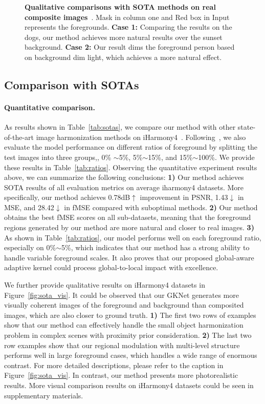 \documentclass[10pt,twocolumn,letterpaper]{article}
\begin{document}
\begin{figure*}[t]
    \caption{{\bf Qualitative comparisons with SOTA methods on real composite images}~\cite{Tsai_2017_CVPR}. Mask in column one and Red box in Input represents the foregrounds. \textbf{Case 1:} Comparing the results on the dogs, our method achieves more natural results over the sunset background.  \textbf{Case 2:} Our result dims the foreground person based on background dim light, which achieves a more natural effect. }
    \label{fig:real_vis}
    \vspace{-1.0em}
\end{figure*}

\subsection{Comparison with SOTAs}

\paragraph{Quantitative comparison.}
As results shown in Table~\ref{tab:sotas}, we compare our method with other state-of-the-art image harmonization methods on iHarmony4~\cite{Cong_2020_CVPR}. Following~\cite{Cong_2020_CVPR,Sofiiuk_2021_WACV}, we also evaluate the model performance on different ratios of foreground by splitting the test images into three groups,\ie, {0\% $\sim$5\%}, {5\%$\sim$15\%}, and {15\%$\sim$100\%}. We provide these results in Table~\ref{tab:ratios}. Observing the quantitative experiment results above, we can summarize the following conclusions: {\bf 1)} Our method achieves SOTA results of all evaluation metrics on average iharmony4 datasets. More specifically, our method achieves 0.78dB$\uparrow$ improvement in PSNR, 1.43$\downarrow$ in MSE, and 28.42$\downarrow$ in fMSE compared with suboptimal methods. {\bf 2)} Our method obtains the best fMSE scores on all sub-datasets, meaning that the foreground regions generated by our method are more natural and closer to real images. {\bf 3)} As shown in Table~\ref{tab:ratios}, our model performs well on each foreground ratio, especially on {0\%$\sim$5\%}, which indicates that our method has a strong ability to handle variable foreground scales. It also proves that our proposed global-aware adaptive kernel could process global-to-local impact with excellence.

We further provide qualitative results on iHarmony4 datasets in Figure~\ref{fig:sota_vis}. It could be observed that our GKNet generates more visually coherent images of the foreground and background than composited images, which are also closer to ground truth. 
{\bf 1)} The first two rows of examples show that our method can effectively handle the small object harmonization problem in complex scenes with proximity prior consideration.
{\bf 2)} The last two row examples show that our regional modulation with multi-level structure performs well in large foreground cases, which handles a wide range of enormous contrast. For more detailed descriptions, please refer to the caption in Figure~\ref{fig:sota_vis}.
In contrast, our method presents more photorealistic results. More visual comparison results on iHarmony4 datasets could be seen in supplementary materials.
\end{document}
